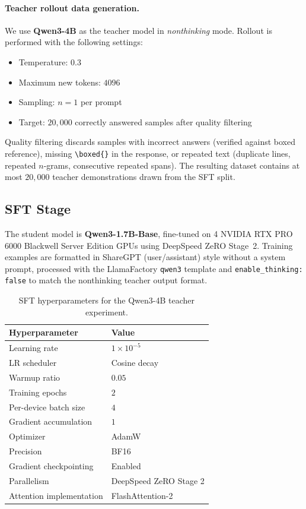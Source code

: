 \paragraph{Teacher rollout data generation.}
We use \textbf{Qwen3-4B} as the teacher model in \emph{nonthinking} mode.
Rollout is performed with the following settings:
\begin{itemize}
    \item Temperature: $0.3$
    \item Maximum new tokens: $4096$
    \item Sampling: $n{=}1$ per prompt
    \item Target: $20{,}000$ correctly answered samples after quality filtering
\end{itemize}
Quality filtering discards samples with incorrect answers (verified against boxed reference), missing \texttt{\textbackslash boxed\{\}} in the response, or repeated text (duplicate lines, repeated $n$-grams, consecutive repeated spans).
The resulting dataset contains at most $20{,}000$ teacher demonstrations drawn from the SFT split.


\subsection*{SFT Stage}
The student model is \textbf{Qwen3-1.7B-Base}, fine-tuned on 4 NVIDIA RTX PRO 6000 Blackwell Server Edition GPUs using DeepSpeed ZeRO Stage~2.
Training examples are formatted in ShareGPT (user/assistant) style without a system prompt, processed with the LlamaFactory \texttt{qwen3} template and \texttt{enable\_thinking: false} to match the nonthinking teacher output format.

\begin{table}[h]
\centering
\begin{tabular}{ll}
\hline
\textbf{Hyperparameter} & \textbf{Value} \\
\hline
Learning rate             & $1 \times 10^{-5}$ \\
LR scheduler              & Cosine decay \\
Warmup ratio              & $0.05$ \\
Training epochs           & $2$ \\
Per-device batch size     & $4$ \\
Gradient accumulation     & $1$ \\
Optimizer                 & AdamW \\
Precision                 & BF16 \\
Gradient checkpointing    & Enabled \\
Parallelism               & DeepSpeed ZeRO Stage 2 \\
Attention implementation  & FlashAttention-2 \\
\hline
\end{tabular}
\caption{SFT hyperparameters for the Qwen3-4B teacher experiment.}
\end{table}



